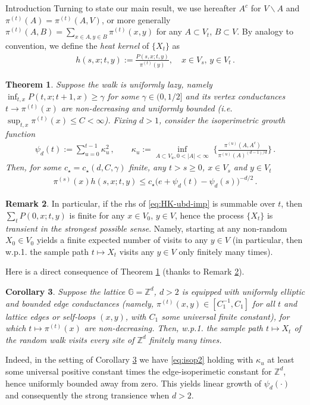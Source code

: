 \documentclass[12pt,reqno]{amsart}
\numberwithin{equation}{section}
\newtheorem{thm}{Theorem}[section]
\newtheorem{cor}[thm]{Corollary}
\theoremstyle{definition}
\newtheorem{remark}[thm]{Remark}
\begin{document}
\begin{section}{Introduction}
Turning to state our main result, we use hereafter 
$A^c$ for $V\backslash A$ and $\pi^{(t)}(A)=\pi^{(t)}(A,V)$, 
or more generally $\pi^{(t)}(A,B)=\sum_{x\in A, y\in B}\pi^{(t)}(x,y)$ 
for any $A \subset V_t$, $B \subset V$. 
By analogy to convention, we define the {\emph{heat kernel}} of $\{X_t\}$ as
\begin{align}\label{eq:ht-def}
h(s,x;t,y):=\frac{P(s,x;t,y)}{\pi^{(t)}(y)}, \quad x\in V_s,\, y\in V_t\,.
\end{align}
\begin{thm}\label{thm-main}
Suppose the walk is uniformly lazy, namely 
$\inf_{t,x} P(t,x;t+1,x) \ge \gamma$ for some 
$\gamma\in (0,1/2]$ and its 
vertex conductances $t\rightarrow\pi^{(t)}(x)$ 
are non-decreasing and uniformly bounded
(i.e. $\sup_{t,x} \pi^{(t)}(x) \leq C < \infty$). 
Fixing $d>1$, 
consider the isoperimetric growth function
\begin{align}
\psi_d(t) :=  \sum_{u=0}^{t-1} \kappa_u^2 \,,\qquad    
\kappa_{u} := \inf_{A \subset V_u, 0<|A|<\infty} \; \Big\{ \frac{\pi^{(u)}(A,A^c)}{\pi^{(u)}(A)^{(d-1)/d}} \Big\} \,.
\label{eq:isop2}
\end{align}
Then, for some $c_{\star}=c_{\star}(d,C,\gamma)$ finite, 
any $t> s \ge 0$, $x \in V_s$ and $y \in V_t$
\begin{align}\label{eq:HK-ubd-imp}
{\pi^{(s)}(x)} h(s,x;t,y) \le c_{\star} \big( e + \psi_d(t)-\psi_d(s) \big)^{- d/2}\,.
\end{align}
\end{thm}

\begin{remark}\label{rmk:trans} 
In particular, if the {{\sc\lowercase{{rhs}}}} of \eqref{eq:HK-ubd-imp} is summable over $t$, 
then $\sum_t P(0,x;t,y)$ is finite for any $x \in V_0$, $y \in V$,
hence the process
$\{X_t\}$ is \emph{transient in the strongest possible sense}. Namely, starting 
at any non-random $X_0 \in V_0$ yields a finite expected number of visits 
to any $y \in V$ (in particular, then 
w.p.1. the sample path $t \mapsto X_t$ visits 
any $y \in V$ only finitely many times).
\end{remark}

Here is a direct consequence of Theorem \ref{thm-main} (thanks to Remark \ref{rmk:trans}).
\begin{cor}\label{cor:u-ellip} 
Suppose the lattice ${\mathbb{G}}={\mathbb{Z}}^d$, $d>2$ is equipped with 
\emph{uniformly elliptic} and bounded \emph{edge conductances}
(namely, $\pi^{(t)}(x,y)\in[C_1^{-1},C_1]$ for all $t$ and lattice edges 
or self-loops $(x,y)$, with $C_1$ some universal finite constant),
for which $t \mapsto \pi^{(t)}(x)$ are non-decreasing. Then, w.p.1.
the sample path $t \mapsto X_t$ of the random walk visits 
every site of ${\mathbb{Z}}^d$ finitely many times. 
\end{cor}
Indeed, in the setting of Corollary \ref{cor:u-ellip} we have
\eqref{eq:isop2} holding with $\kappa_u$ 
at least some universal positive constant 
times the edge-isoperimetic constant for ${\mathbb{Z}}^d$, hence uniformly bounded 
away from zero. This yields linear growth of $\psi_d(\cdot)$ and consequently
the strong transience when $d>2$. 


\end{section}
\end{document}
